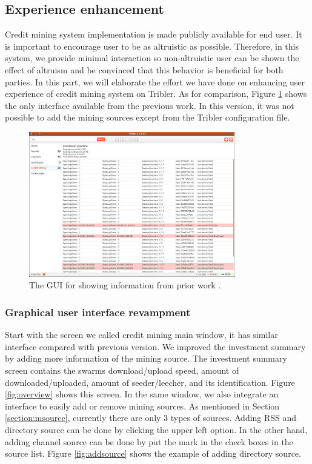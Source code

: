 \subsection{Experience enhancement}
Credit mining system implementation is made publicly available for end user. It is important to encourage user to be as altruistic as possible. Therefore, in this system, we provide minimal interaction so non-altruistic user can be shown the effect of altruism and be convinced that this behavior is beneficial for both parties. In this part, we will elaborate the effort we have done on enhancing user experience of credit mining system on Tribler. As for comparison, Figure \ref{fig:oldcm} shows the only interface available from the previous work. In this version, it was not possible to add the mining sources except from the Tribler configuration file. 

\begin{figure}[h]
	\centering
	\includegraphics[width=0.8\textwidth]{pics/old_cm.png}
	\caption{The GUI for showing information from prior work \cite{2015:creditmining:capota}.}
	\label{fig:oldcm}
\end{figure}

\subsubsection{Graphical user interface revampment}

Start with the screen we called credit mining main window, it has similar interface compared with previous version. We improved the investment summary by adding more information of the mining source. The investment summary screen contains the swarms download/upload speed, amount of downloaded/uploaded, amount of seeder/leecher, and its identification. Figure \ref{fig:overview} shows this screen. In the same window, we also integrate an interface to easily add or remove mining sources. As mentioned in Section \ref{section:msource}, currently there are only 3 types of sources. Adding RSS and directory source can be done by clicking the upper left option. In the other hand, adding channel source can be done by put the mark in the check boxes in the source list. Figure \ref{fig:addsource} shows the example of adding directory source.

